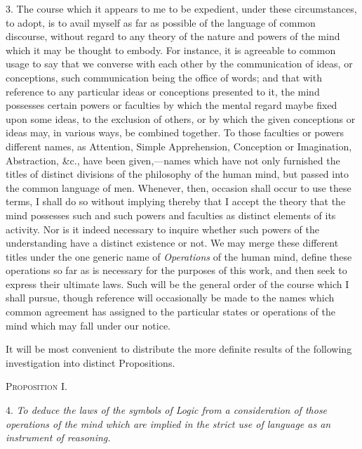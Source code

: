 \documentclass[oneside]{book}
\begin{document}
3. The course which it appears to me to be expedient, under
these circumstances, to adopt, is to avail myself as far as possible
of the language of common discourse, without regard to any
theory of the nature and powers of the mind which it may be
thought to embody. For instance, it is agreeable to common
usage to say that we converse with each other by the communication
of ideas, or conceptions, such communication being the
office of words; and that with reference to any particular ideas or
conceptions presented to it, the mind possesses certain powers or
faculties by which the mental regard maybe fixed upon some ideas,
to the exclusion of others, or by which the given conceptions or
ideas may, in various ways, be combined together. To those
faculties or powers different names, as Attention, Simple Apprehension,
Conception or Imagination, Abstraction, \&c., have been
given,---names which have not only furnished the titles of distinct
divisions of the philosophy of the human mind, but passed into
the common language of men. Whenever, then, occasion shall
occur to use these terms, I shall do so without implying thereby
that I accept the theory that the mind possesses such and such
powers and faculties as distinct elements of its activity. Nor is
it indeed necessary to inquire whether such powers of the understanding
have a distinct existence or not. We may merge these
different titles under the one generic name of \textit{Operations} of the
human mind, define these operations so far as is necessary for the
purposes of this work, and then seek to express their ultimate laws.
Such will be the general order of the course which I shall pursue,
though reference will occasionally be made to the names which
common agreement has assigned to the particular states or operations
of the mind which may fall under our notice.

It will be most convenient to distribute the more definite results
of the following investigation into distinct Propositions.

\begin{center}
\textsc{Proposition I.}
\end{center}

4. \textit{To deduce the laws of the symbols of Logic from a consideration
of those operations of the mind which are implied in the strict
use of language as an instrument of reasoning.}
\end{document}
